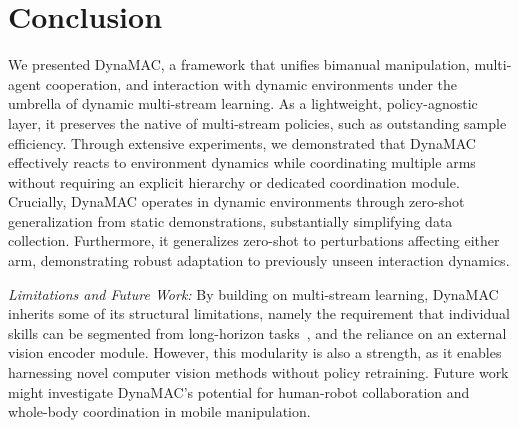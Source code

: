\documentclass[letterpaper, 10 pt, journal, twoside]{IEEEtran}
\newcommand{\para}[1]{\parskip=5pt\noindent\textit{#1}}
\newcommand{\ourmethod}{DynaMAC\xspace}
\begin{document}
\section{Conclusion}
%
%
%
%
We presented \ourmethod{}, a framework that unifies bimanual manipulation, multi-agent cooperation, and interaction with dynamic environments under the umbrella of dynamic multi-stream learning.
As a lightweight, policy-agnostic layer, it preserves the native of multi-stream policies, such as outstanding sample efficiency.
Through extensive experiments, we demonstrated that \ourmethod{} effectively reacts to environment dynamics while coordinating multiple arms without requiring an explicit hierarchy or dedicated coordination module. 
Crucially, \ourmethod{} operates in dynamic environments through zero-shot generalization from static demonstrations, substantially simplifying data collection.
Furthermore, it generalizes zero-shot to perturbations affecting either arm, demonstrating robust adaptation to previously unseen interaction dynamics.

\para{Limitations and Future Work:}
By building on multi-stream learning, \ourmethod{} inherits some of its structural limitations, namely the requirement that individual skills can be segmented from long-horizon tasks~\cite{von2024art}, and the reliance on an external vision encoder module.
However, this modularity is also a strength, as it enables harnessing novel computer vision methods without policy retraining.
%
Future work might investigate \ourmethod{}'s potential for human-robot collaboration and whole-body coordination in mobile manipulation.




\end{document}
